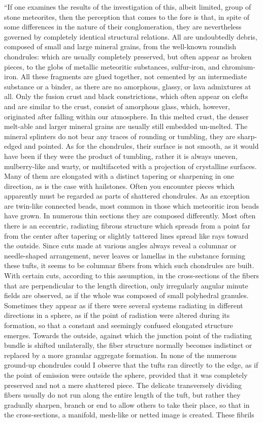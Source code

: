 \documentclass[a4paper, 12pt, oneside]{article}
\begin{document}
``If one examines the results of the investigation of this, albeit limited, group of stone meteorites, then the perception that comes to the fore is that, in spite of some differences in the nature of their conglomeration, they are nevertheless governed by completely identical structural relations. All are undoubtedly debris, composed of small and large mineral grains, from the well-known roundish chondrules: which are usually completely preserved, but often appear as broken pieces, to the globs of metallic meteoritic substances, sulfur-iron, and chromium-iron. All these fragments are glued together, not cemented by an intermediate substance or a binder, as there are no amorphous, glassy, or lava admixtures at all. Only the fusion crust and black constrictions, which often appear on clefts and are similar to the crust, consist of amorphous glass, which, however, originated after falling within our atmosphere. In this melted crust, the denser melt-able and larger mineral grains are usually still embedded un-melted. The mineral splinters do not bear any traces of rounding or tumbling, they are sharp-edged and pointed. As for the chondrules, their surface is not smooth, as it would have been if they were the product of tumbling, rather it is always uneven, mulberry-like and warty, or multifaceted with a projection of crystalline surfaces. Many of them are elongated with a distinct tapering or sharpening in one direction, as is the case with hailstones. Often you encounter pieces which apparently must be regarded as parts of shattered chondrules. As an exception are twin-like connected beads, most common in those which meteoritic iron beads have grown. In numerous thin sections they are composed differently. Most often there is an eccentric, radiating fibrous structure which spreads from a point far from the center after tapering or slightly tattered lines spread like rays toward the outside. Since cuts made at various angles always reveal a columnar or needle-shaped arrangement, never leaves or lamellas in the substance forming these tufts, it seems to be columnar fibers from which such chondrules are built. With certain cuts, according to this assumption, in the cross-sections of the fibers that are perpendicular to the length direction, only irregularly angular minute fields are observed, as if the whole was composed of small polyhedral granules. Sometimes they appear as if there were several systems radiating in different directions in a sphere, as if the point of radiation were altered during its formation, so that a constant and seemingly confused elongated structure emerges. Towards the outside, against which the junction point of the radiating bundle is shifted unilaterally, the fiber structure normally becomes indistinct or replaced by a more granular aggregate formation. In none of the numerous ground-up chondrules could I observe that the tufts ran directly to the edge, as if the point of emission were outside the sphere, provided that it was completely preserved and not a mere shattered piece. The delicate transversely dividing fibers usually do not run along the entire length of the tuft, but rather they gradually sharpen, branch or end to allow others to take their place, so that in the cross-sections, a manifold, mesh-like or netted image is created. These fibrils 
\end{document}
